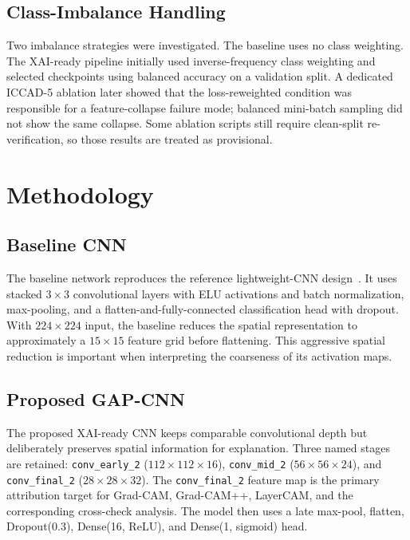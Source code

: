\documentclass[conference]{IEEEtran}
\begin{document}
\subsection{Class-Imbalance Handling}
Two imbalance strategies were investigated. The baseline uses no class weighting. The XAI-ready pipeline initially used inverse-frequency class weighting and selected checkpoints using balanced accuracy on a validation split. A dedicated ICCAD-5 ablation later showed that the loss-reweighted condition was responsible for a feature-collapse failure mode; balanced mini-batch sampling did not show the same collapse. Some ablation scripts still require clean-split re-verification, so those results are treated as provisional.

\section{Methodology}

\subsection{Baseline CNN}
The baseline network reproduces the reference lightweight-CNN design~\cite{verma2026, borisov2018}. It uses stacked $3\times3$ convolutional layers with ELU activations and batch normalization, max-pooling, and a flatten-and-fully-connected classification head with dropout. With $224\times224$ input, the baseline reduces the spatial representation to approximately a $15\times15$ feature grid before flattening. This aggressive spatial reduction is important when interpreting the coarseness of its activation maps.

\subsection{Proposed GAP-CNN}
The proposed XAI-ready CNN keeps comparable convolutional depth but deliberately preserves spatial information for explanation. Three named stages are retained: \texttt{conv\_early\_2} ($112\times112\times16$), \texttt{conv\_mid\_2} ($56\times56\times24$), and \texttt{conv\_final\_2} ($28\times28\times32$). The \texttt{conv\_final\_2} feature map is the primary attribution target for Grad-CAM, Grad-CAM++, LayerCAM, and the corresponding cross-check analysis. The model then uses a late max-pool, flatten, Dropout(0.3), Dense(16, ReLU), and Dense(1, sigmoid) head.
\end{document}
